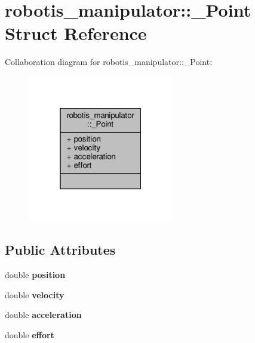 \hypertarget{structrobotis__manipulator_1_1___point}{}\section{robotis\+\_\+manipulator\+:\+:\+\_\+\+Point Struct Reference}
\label{structrobotis__manipulator_1_1___point}


Collaboration diagram for robotis\+\_\+manipulator\+:\+:\+\_\+\+Point\+:
\nopagebreak
\begin{figure}[H]
\begin{center}
\leavevmode
\includegraphics[width=181pt]{structrobotis__manipulator_1_1___point__coll__graph}
\end{center}
\end{figure}
\subsection*{Public Attributes}
\begin{DoxyCompactItemize}
\item 
double {\bfseries position}\hypertarget{structrobotis__manipulator_1_1___point_a32aa4bc190b70fad0fcc1ede694ed6c8}{}\label{structrobotis__manipulator_1_1___point_a32aa4bc190b70fad0fcc1ede694ed6c8}

\item 
double {\bfseries velocity}\hypertarget{structrobotis__manipulator_1_1___point_adb2edab9924b80a6fe72eac350eb0d8e}{}\label{structrobotis__manipulator_1_1___point_adb2edab9924b80a6fe72eac350eb0d8e}

\item 
double {\bfseries acceleration}\hypertarget{structrobotis__manipulator_1_1___point_a9b1e436b22d9b22736e971e9452d4063}{}\label{structrobotis__manipulator_1_1___point_a9b1e436b22d9b22736e971e9452d4063}

\item 
double {\bfseries effort}\hypertarget{structrobotis__manipulator_1_1___point_a6414ac5935dd7baee0079c4da4a0a613}{}\label{structrobotis__manipulator_1_1___point_a6414ac5935dd7baee0079c4da4a0a613}

\end{DoxyCompactItemize}


